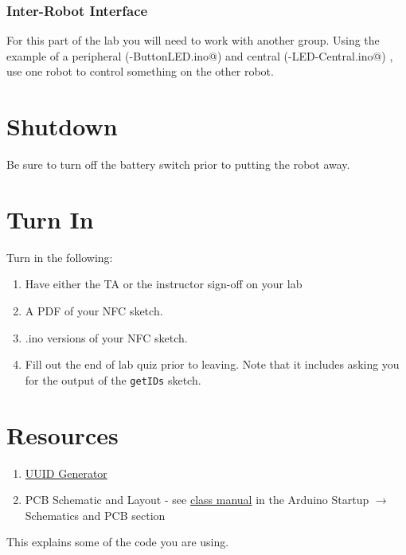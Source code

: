 \subsubsection{Inter-Robot Interface}
For this part of the lab you will need to work with another group. Using the example 
of a peripheral (\lstinline@BLE-ButtonLED.ino@) and central (\lstinline@BLE-LED-Central.ino@)
, use one robot to control something on the other robot.



\section{Shutdown}
Be sure to turn off the battery switch prior to putting the robot away.

\section{Turn In}
Turn in the following:
\begin{enumerate}
    \item Have either the TA or the instructor sign-off on your lab
    \item A PDF of your NFC sketch.
    \item .ino versions of your NFC sketch.
    \item Fill out the end of lab quiz prior to leaving. Note that it includes asking you 
            for the output of the \lstinline$getIDs$ sketch. 
\end{enumerate}

\section{Resources}\label{sec:wirelessresources}
\begin{enumerate}
    \item \href{https://www.uuidgenerator.net/}{UUID Generator} 
    \item PCB Schematic and Layout - see 
            \href{https://github.com/semcneil/Fundamentals-of-Microcontrollers-Manual}{class manual} 
            in the Arduino Startup $\rightarrow$ Schematics and PCB section
\end{enumerate}
This explains some of the code you are using.

